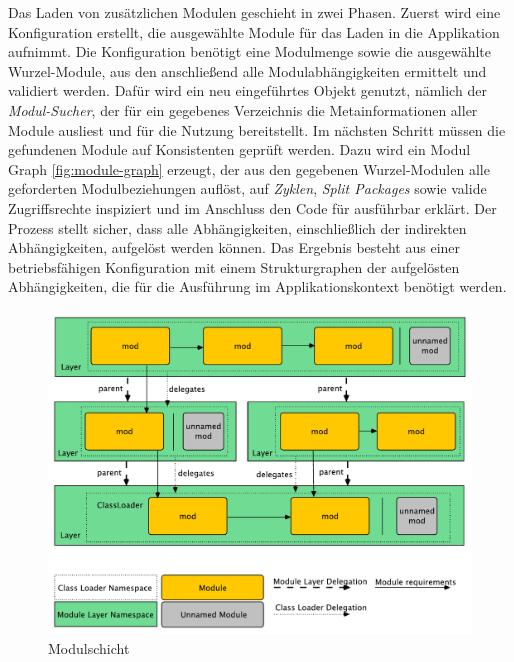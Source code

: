      Das Laden von zusätzlichen Modulen geschieht in zwei Phasen. Zuerst wird eine Konfiguration erstellt, die ausgewählte Module für das Laden in die Applikation aufnimmt. Die Konfiguration benötigt eine Modulmenge sowie die ausgewählte Wurzel-Module, aus den anschließend alle Modulabhängigkeiten ermittelt und validiert werden. Dafür wird ein neu eingeführtes Objekt genutzt, nämlich der \textit{Modul-Sucher}, der für ein gegebenes Verzeichnis die Metainformationen aller Module ausliest und für die Nutzung bereitstellt. \newline
     Im nächsten Schritt müssen die gefundenen Module auf Konsistenten geprüft werden. Dazu wird ein Modul Graph \ref{fig:module-graph} erzeugt, der aus den gegebenen Wurzel-Modulen alle geforderten Modulbeziehungen auflöst, auf \textit{Zyklen}, \textit{Split Packages} sowie valide Zugriffsrechte inspiziert und im Anschluss den Code für ausführbar erklärt. Der Prozess stellt sicher, dass alle Abhängigkeiten, einschließlich der indirekten Abhängigkeiten, aufgelöst werden können.\newline
     Das Ergebnis besteht aus einer betriebsfähigen Konfiguration mit einem Strukturgraphen der aufgelösten Abhängigkeiten, die für die Ausführung im Applikationskontext benötigt werden. \cite{java9modRevealed}\bigbreak 

    \begin{figure}[h!]
      \centering
      \includegraphics[width=\textwidth]{material/images/module-layer.pdf}
      \caption{Modulschicht \cite{javaMod9}}
      \label{fig:module-layer}
    \end{figure}

